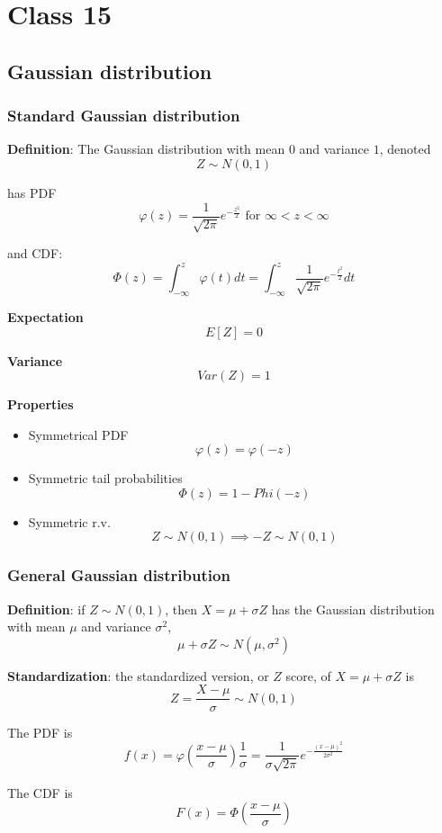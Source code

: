 \chapter{Class 15}

\section{Gaussian distribution}

\subsection{Standard Gaussian distribution}
\begin{framed}
   \textbf{Definition}: The Gaussian distribution with mean $0$ and variance $1$, denoted
   \[
     Z \sim N(0, 1)
   \] 

   has PDF
   \[
      \varphi(z) = \frac{1}{\sqrt{2\pi}}e^{ - \frac{z^2}{2}} \text{ for } \infty < z < \infty
   \] 

   and CDF:
   \[
      \Phi (z) = \int_{-\infty}^{z}  \varphi(t) dt = \int_{-\infty}^{z}    \frac{1}{\sqrt{2\pi}} e^{- \frac{t^2}{2}} dt
   \] 

   \textbf{Expectation}
   \[
     E\left[ Z\right]  = 0
   \] 

   \textbf{Variance}
   \[
     Var(Z) = 1
   \] 

   \textbf{Properties}
   \begin{itemize}
      \item Symmetrical PDF
         \[
           \varphi(z) = \varphi(-z)
        \]
      \item Symmetric tail probabilities
         \[
           \Phi(z) = 1 - Phi(-z)
         \]
      \item Symmetric r.v.
         \[
           Z \sim N(0, 1) \implies -Z \sim N(0, 1)
         \] 
   \end{itemize}
\end{framed}

\subsection{General Gaussian distribution}
\begin{framed}
   \textbf{Definition}: if $Z \sim N(0, 1)$, then $X = \mu + \sigma Z $ has the Gaussian distribution with mean $\mu$ and variance $\sigma^2$,
    \[
     \mu + \sigma Z \sim N(\mu, \sigma^2)
   \] 

   \textbf{Standardization}: the standardized version, or $Z$ score, of $X = \mu + \sigma Z$ is
   \[
     Z = \frac{X - \mu}{\sigma} \sim N(0, 1)
   \] 

   The PDF is
   \[
      f(x) = \varphi( \frac{x - \mu}{ \sigma}) \frac{1}{\sigma} = \frac{1}{\sigma \sqrt{2 \pi }} e^{ - \frac{(x - \mu)^2}{2 \sigma^2}}
   \] 

   The CDF is
   \[
     F(x) = \Phi \left(  \frac{x - \mu}{\sigma} \right) 
   \] 
\end{framed}

